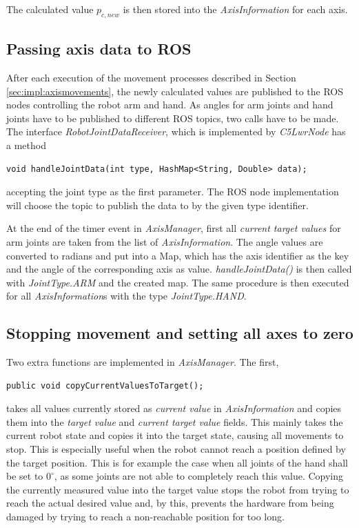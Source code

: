 The calculated value $p_{c,new}$ is then stored into the \textit{AxisInformation} for each axis.

\subsection{Passing axis data to ROS}
\label{sec:impl:aximgrros}

After each execution of the movement processes described in Section \ref{sec:impl:axismovements}, the newly calculated values are published to the ROS nodes controlling the robot arm and hand. As angles for arm joints and hand joints have to be published to different ROS topics, two calls have to be made. The interface \textit{RobotJointDataReceiver}, which is implemented by \textit{C5LwrNode} has a method
\begin{lstlisting}
void handleJointData(int type, HashMap<String, Double> data);
\end{lstlisting}
accepting the joint type as the first parameter. The ROS node implementation will choose the topic to publish the data to by the given type identifier.

At the end of the timer event in \textit{AxisManager}, first all \textit{current target values} for arm joints are taken from the list of \textit{AxisInformation}. The angle values are converted to radians and put into a Map, which has the axis identifier as the key and the angle of the corresponding axis as value. \textit{handleJointData()} is then called with \textit{JointType.ARM} and the created map. The same procedure is then executed for all \textit{AxisInformation}s with the type \textit{JointType.HAND}.

\subsection{Stopping movement and setting all axes to zero}
\label{sec:impl:axism:stop}
Two extra functions are implemented in \textit{AxisManager}. The first,
\begin{lstlisting}
public void copyCurrentValuesToTarget();
\end{lstlisting}
takes all values currently stored as \textit{current value} in \textit{AxisInformation} and copies them into the \textit{target value} and \textit{current target value} fields. This mainly takes the current robot state and copies it into the target state, causing all movements to stop. This is especially useful when the robot cannot reach a position defined by the target position. This is for example the case when all joints of the hand shall be set to $0^\circ$, as some joints are not able to completely reach this value. Copying the currently measured value into the target value stops the robot from trying to reach the actual desired value and, by this, prevents the hardware from being damaged by trying to reach a non-reachable position for too long.

